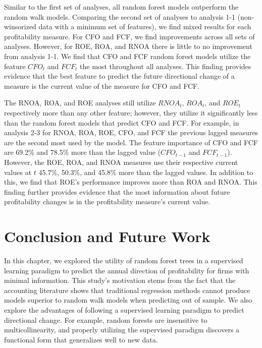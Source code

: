 Similar to the first set of analyses, all random forest models outperform the random walk models. Comparing the second set of analyses to analysis 1-1 (non-winsorized data with a minimum set of features), we find mixed results for each profitability measure. For CFO and FCF, we find improvements across all sets of analyses. However, for ROE, ROA, and RNOA there is little to no improvement from analysis 1-1.  We find that CFO and FCF random forest models utilize the feature \(CFO_t\) and \(FCF_t\) the most throughout all analyses. This finding provides evidence that the best feature to predict the future directional change of a measure is the current value of the measure for CFO and FCF. 

The RNOA, ROA, and ROE analyses still utilize \(RNOA_t\), \(ROA_t\), and \(ROE_t\) respectively more than any other feature; however, they utilize it significantly less than the random forest models that predict CFO and FCF. For example, in analysis 2-3  for RNOA, ROA, ROE, CFO, and FCF the previous lagged measures are the second most used by the model. The feature importance of CFO and FCF are 69.2\% and 78.5\% more than the lagged value (\(CFO_{t-1}\) and \(FCF_{t-1}\)). However, the ROE, ROA, and RNOA measures use their respective current values at \(t\) 45.7\%, 50.3\%, and 45.8\% more than the lagged values. In addition to this, we find that ROE's performance improves more than ROA and RNOA. This finding further provides evidence that the most information about future profitability changes is in the profitability measure's current value.

\section{Conclusion and Future Work}

In this chapter, we explored the utility of random forest trees in a supervised learning paradigm to predict the annual direction of profitability for firms with minimal information. This study's motivation stems from the fact that the accounting literature shows that traditional regression methods cannot produce models superior to random walk models when predicting out of sample. We also explore the advantages of following a supervised learning paradigm to predict directional change. For example, random forests are insensitive to multicollinearity, and properly utilizing the supervised paradigm discovers a functional form that generalizes well to new data.

